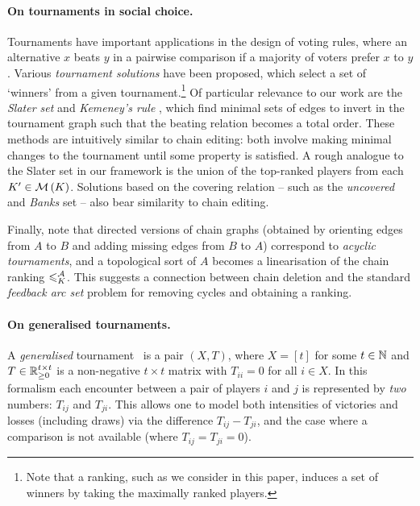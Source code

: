 \paragraph{On tournaments in social choice.}
%
Tournaments have important applications in the design of voting rules, where an
alternative $x$ beats $y$ in a pairwise comparison if a majority of voters
prefer $x$ to $y$.  Various \emph{tournament solutions} have been proposed,
which select a set of `winners' from a given tournament.\footnote{Note that a
ranking, such as we consider in this paper, induces a set of winners by taking
the maximally ranked players.}
%
Of particular relevance to our work are the \emph{Slater set} and
\emph{Kemeney's rule} \cite{brandt2016a}, which find minimal sets of edges to
invert in the tournament graph such that the beating relation becomes a total
order.\footnotemark{}
These methods are intuitively similar to chain editing: both
involve making minimal changes to the tournament until some property is
satisfied. A rough analogue to the Slater set in our framework is the union of
the top-ranked players from each $K' \in \operatorname{\mathcal{M}}\left({K}\right)$. Solutions based on the
covering relation -- such as the \emph{uncovered} and \emph{Banks} set
\cite{brandt2016a} -- also bear similarity to chain editing.


Finally, note that directed versions of chain graphs (obtained by orienting
edges from $A$ to $B$ and adding missing edges from $B$ to $A$) correspond to
\emph{acyclic tournaments}, and a topological sort of $A$ becomes a
linearisation of the chain ranking $\leqslant^{\mathcal{A}}_K$. This suggests a connection
between chain deletion and the standard \emph{feedback arc set} problem for
removing cycles and obtaining a ranking.

\paragraph{On generalised tournaments.}
%
A \emph{generalised} tournament~\cite{gonzalez2014paired} is a pair $(X, T)$,
where $X = [t]$ for some $t \in \mathbb{N}$ and $T \in \mathbb{R}_{\ge 0}^{t \times t}$ is a
non-negative $t \times t$ matrix with $T_{ii} = 0$ for all $i \in X$. In this
formalism each encounter between a pair of players $i$ and $j$ is represented
by \emph{two} numbers: $T_{ij}$ and $T_{ji}$. This allows one to model both
intensities of victories and losses (including draws) via the difference
$T_{ij} - T_{ji}$, and the case where a comparison is not available (where
$T_{ij} = T_{ji} = 0$).

